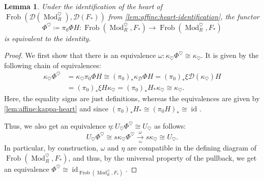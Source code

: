 \documentclass{article}
\theoremstyle{definition}
\theoremstyle{definition}
\theoremstyle{definition}
\theoremstyle{plain}
\newtheorem{lem}[defn]{Lemma}
\theoremstyle{plain}
\theoremstyle{plain}
\theoremstyle{plain}
\theoremstyle{plain}
\theoremstyle{plain}
\theoremstyle{plain}
\theoremstyle{plain}
\theoremstyle{remark}
\theoremstyle{remark}
\theoremstyle{plain}
\theoremstyle{plain}
\theoremstyle{plain}
\theoremstyle{plain}
\theoremstyle{plain}
\newcommand{\id}[1]{\operatorname{id}_{#1}}
\newcommand{\ModDisc}[1]{\operatorname{Mod}_{#1}^{\heartsuit}}
\newcommand{\Frob}[2]{\operatorname{Frob}(#1, #2)}
\newcommand{\Cat}[1]{\mathcal{#1}}
\begin{document}
\begin{lem} \label{lem:affine:Phi-heart-equivalence}
    Under the identification of the heart of $\Frob{\Cat D(\ModDisc{R})}{\Cat D(F_*)}$ from \cref{lem:affine:heart-identification},
    the functor 
    \begin{equation*}
        \Phi^\heartsuit \coloneqq \pi_0 \Phi H \colon \Frob{\ModDisc{R}}{F_*} \to \Frob{\ModDisc{R}}{F_*}
    \end{equation*}
    is equivalent to the identity.
\end{lem}
\begin{proof}
    We first show that there is an equivalence $\omega \colon \kappa_\heartsuit \Phi^\heartsuit \cong \kappa_\heartsuit$.
    It is given by the following chain of equivalences:
    \begin{align*}
        \kappa_\heartsuit \Phi^\heartsuit 
        &= \kappa_\heartsuit \pi_0 \Phi H 
        \cong (\pi_0)_* \kappa_{\Cat D} \Phi H 
        = (\pi_0)_* \xi \Cat D(\kappa_{\heartsuit}) H \\
        &= (\pi_0)_* \xi H \kappa_{\heartsuit} 
        = (\pi_0)_* H_* \kappa_{\heartsuit} 
        \cong \kappa_{\heartsuit}.
    \end{align*}
    Here, the equality signs are just definitions, whereas the equivalences 
    are given by \cref{lem:affine:kappa-heart} and since $(\pi_0)_* H_* \cong (\pi_0 H)_* \cong \id{}$.  

    Thus, we also get an equivalence $\eta \colon U_\heartsuit \Phi^\heartsuit \cong U_\heartsuit$ as follows:
    \begin{equation*}
        U_\heartsuit \Phi^\heartsuit \cong s \kappa_\heartsuit \Phi^\heartsuit \xrightarrow[\simeq]{\omega}  s \kappa_\heartsuit \cong U_\heartsuit.
    \end{equation*}
    In particular, by construction, $\omega$ and $\eta$ are compatible in the defining diagram of $\Frob{\ModDisc{R}}{F_*}$,
    and thus, by the universal property of the pullback, we get an equivalence $\Phi^\heartsuit \cong \id{\Frob{\ModDisc{R}}{F_*}}$.
\end{proof}
\end{document}
